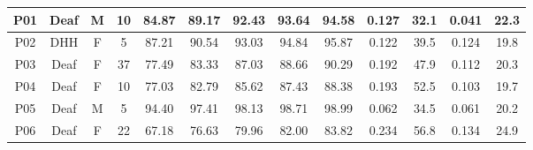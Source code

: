 \begin{table*}[t]
\begin{tabular}{cccc|ccccccc|cc}
\multicolumn{1}{c|}{P01}       & \multicolumn{1}{c|}{Deaf}           & \multicolumn{1}{c|}{M}               & 10            & \multicolumn{1}{c|}{84.87}          & \multicolumn{1}{c|}{89.17}          & \multicolumn{1}{c|}{92.43}          & \multicolumn{1}{c|}{93.64}          & \multicolumn{1}{c|}{94.58}          & \multicolumn{1}{c|}{0.127}          & 32.1          & \multicolumn{1}{c|}{0.041}          & 22.3          \\ \hline
\multicolumn{1}{c|}{P02}       & \multicolumn{1}{c|}{DHH}            & \multicolumn{1}{c|}{F}               & 5             & \multicolumn{1}{c|}{87.21}          & \multicolumn{1}{c|}{90.54}          & \multicolumn{1}{c|}{93.03}          & \multicolumn{1}{c|}{94.84}          & \multicolumn{1}{c|}{95.87}          & \multicolumn{1}{c|}{0.122}          & 39.5          & \multicolumn{1}{c|}{0.124}          & 19.8          \\ \hline
\multicolumn{1}{c|}{P03}       & \multicolumn{1}{c|}{Deaf}           & \multicolumn{1}{c|}{F}               & 37            & \multicolumn{1}{c|}{77.49}          & \multicolumn{1}{c|}{83.33}          & \multicolumn{1}{c|}{87.03}          & \multicolumn{1}{c|}{88.66}          & \multicolumn{1}{c|}{90.29}          & \multicolumn{1}{c|}{0.192}          & 47.9          & \multicolumn{1}{c|}{0.112}          & 20.3          \\ \hline
\multicolumn{1}{c|}{P04}       & \multicolumn{1}{c|}{Deaf}           & \multicolumn{1}{c|}{F}               & 10            & \multicolumn{1}{c|}{77.03}          & \multicolumn{1}{c|}{82.79}          & \multicolumn{1}{c|}{85.62}          & \multicolumn{1}{c|}{87.43}          & \multicolumn{1}{c|}{88.38}          & \multicolumn{1}{c|}{0.193}          & 52.5          & \multicolumn{1}{c|}{0.103}          & 19.7          \\ \hline
\multicolumn{1}{c|}{P05}       & \multicolumn{1}{c|}{Deaf}           & \multicolumn{1}{c|}{M}               & 5             & \multicolumn{1}{c|}{94.40}          & \multicolumn{1}{c|}{97.41}          & \multicolumn{1}{c|}{98.13}          & \multicolumn{1}{c|}{98.71}          & \multicolumn{1}{c|}{98.99}          & \multicolumn{1}{c|}{0.062}          & 34.5          & \multicolumn{1}{c|}{0.061}          & 20.2          \\ \hline
\multicolumn{1}{c|}{P06}       & \multicolumn{1}{c|}{Deaf}           & \multicolumn{1}{c|}{F}               & 22            & \multicolumn{1}{c|}{67.18}          & \multicolumn{1}{c|}{76.63}          & \multicolumn{1}{c|}{79.96}          & \multicolumn{1}{c|}{82.00}          & \multicolumn{1}{c|}{83.82}          & \multicolumn{1}{c|}{0.234}          & 56.8          & \multicolumn{1}{c|}{0.134}          & 24.9          \\ \hline

\end{tabular}
\end{table*}
